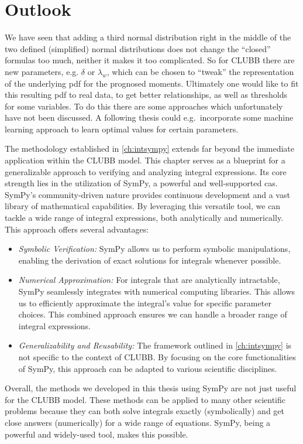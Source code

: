 \chapter{Outlook}\label{ch:outlook}

We have seen that adding a third normal distribution right in the middle of the two defined (simplified) normal distributions does not change the \enquote{closed} formulas too much, neither it makes it too complicated.
So for \gls{CLUBB} there are new parameters, e.g. $\delta$ or $\lambda_w$, which can be chosen to \enquote{tweak} the representation of the underlying \gls{pdf} for the prognosed moments.
Ultimately one would like to fit this resulting \gls{pdf} to real data, to get better relationships, as well as thresholds for some variables.
To do this there are some approaches which unfortunately have not been discussed.
A following thesis could e.g.\ incorporate some machine learning approach to learn optimal values for certain parameters.

The methodology established in \autoref{ch:intsympy} extends far beyond the immediate application within the \gls{CLUBB} model.
This chapter serves as a blueprint for a generalizable approach to verifying and analyzing integral expressions.
Its core strength lies in the utilization of SymPy, a powerful and well-supported \gls{cas}.
SymPy's community-driven nature provides continuous development and a vast library of mathematical capabilities.
By leveraging this versatile tool, we can tackle a wide range of integral expressions, both analytically and numerically.
This approach offers several advantages:
\begin{itemize}
    \item \emph{Symbolic Verification:}
    SymPy allows us to perform symbolic manipulations, enabling the derivation of exact solutions for integrals whenever possible.
    \item \emph{Numerical Approximation:}
    For integrals that are analytically intractable, SymPy seamlessly integrates with numerical computing libraries.
    This allows us to efficiently approximate the integral's value for specific parameter choices.
    This combined approach ensures we can handle a broader range of integral expressions.
    \item \emph{Generalizability and Reusability:} The framework outlined in \cref{ch:intsympy} is not specific to the context of \gls{CLUBB}.
    By focusing on the core functionalities of SymPy, this approach can be adapted to various scientific disciplines.
\end{itemize}
Overall, the methods we developed in this thesis using SymPy are not just useful for the \gls{CLUBB} model.
These methods can be applied to many other scientific problems because they can both solve integrals exactly (symbolically) and get close answers (numerically) for a wide range of equations.
SymPy, being a powerful and widely-used tool, makes this possible.